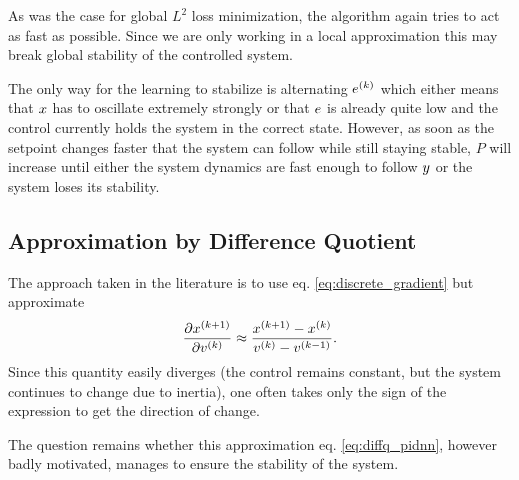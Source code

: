 \documentclass{article}
\begin{document}
    As was the case for global $L^2$ loss minimization, the algorithm again tries to act as fast as possible. 
    Since we are only working in a local approximation this may break global stability of the controlled
    system.

    The only way for the learning to stabilize is alternating ${e}^{(k)}$ which either means
    that $x$ has to oscillate extremely strongly or that $e$ is already quite low and 
    the control currently holds the system in the correct state. However, as soon as the setpoint 
    changes faster that the system can follow while still staying stable, $P$ will increase until
    either the system dynamics are fast enough to follow $y$ or the system loses its stability.



  \subsection{Approximation by Difference Quotient}
    The approach taken in the literature \cite{cong_novel_2005} is to use eq. \eqref{eq:discrete_gradient} but approximate 
    \begin{align}
        \frac{\partial {x}^{(k+1)}}{\partial {v}^{(k)}} \approx \frac{{x}^{(k+1)} - {x}^{(k)}}{{v}^{(k)} - {v}^{(k-1)}}.
    \end{align}
    Since this quantity easily diverges (the control remains constant, but the system continues to change due to inertia), 
    one often takes only the sign of the expression to get the direction of change. 

    The question remains whether this approximation eq. \eqref{eq:diffq_pidnn}, however badly motivated, manages to ensure
    the stability of the system.
\end{document}
